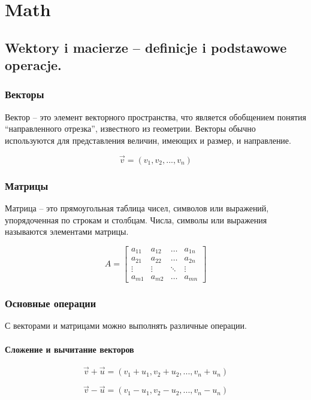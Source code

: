 \chapter{Math}
\section{Wektory i macierze – definicje i podstawowe operacje. }

\subsection{Векторы}

Вектор -- это элемент векторного пространства, что является обобщением понятия ``направленного отрезка'', известного из геометрии. Векторы обычно используются для представления величин, имеющих и размер, и направление.

\[
\vec{v} = (v_1, v_2, ..., v_n)
\]

\subsection{Матрицы}

Матрица -- это прямоугольная таблица чисел, символов или выражений, упорядоченная по строкам и столбцам. Числа, символы или выражения называются элементами матрицы.

\[
A = \begin{bmatrix}
a_{11} & a_{12} & \dots & a_{1n} \\
a_{21} & a_{22} & \dots & a_{2n} \\
\vdots & \vdots & \ddots & \vdots \\
a_{m1} & a_{m2} & \dots & a_{mn}
\end{bmatrix}
\]

\subsection{Основные операции}

С векторами и матрицами можно выполнять различные операции. 

\subsubsection{Сложение и вычитание векторов}

\[
\vec{v} + \vec{u} = (v_1 + u_1, v_2 + u_2, ..., v_n + u_n)
\]

\[
\vec{v} - \vec{u} = (v_1 - u_1, v_2 - u_2, ..., v_n - u_n)
\]

